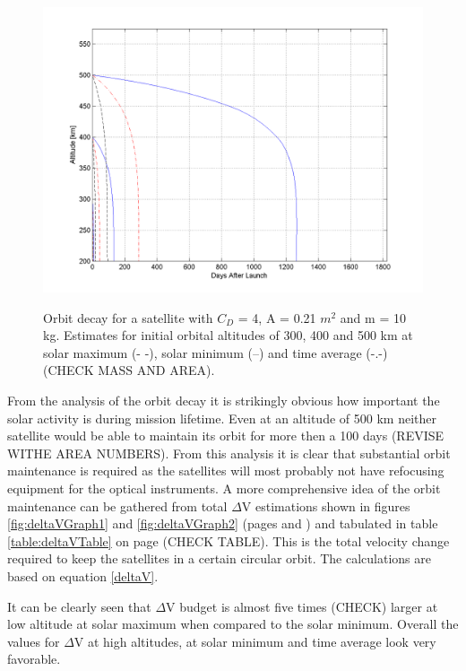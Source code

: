 \begin{figure}[h!]
\centering
\includegraphics[width=0.95\textheight, angle=90]{img/orbitDecayRecieverMin.png}
\label{fig:decayReceiver}
\caption{Orbit decay for a satellite with $C_D$ = 4, A = 0.21 $m^2$ and m = 10 kg. Estimates for initial orbital altitudes of 300, 400 and 500 km at solar maximum (- -), solar minimum (--) and time average (-.-) (CHECK MASS AND AREA).}
\end{figure}

From the analysis of the orbit decay it is strikingly obvious how important the solar activity is during mission lifetime. Even at an altitude of 500 km neither satellite would be able to maintain its orbit for more then a 100 days (REVISE WITHE AREA NUMBERS). From this analysis it is clear that substantial orbit maintenance is required as the satellites will most probably not have refocusing equipment for the optical instruments. A more comprehensive idea of the orbit maintenance can be gathered from total $\Delta$V estimations shown in figures \ref{fig:deltaVGraph1} and \ref{fig:deltaVGraph2} (pages \pageref{fig:deltaVGraph1} and \pageref{fig:deltaVGraph2}) and tabulated in table \ref{table:deltaVTable} on page \pageref{table:deltaVTable}(CHECK TABLE). This is the total velocity change required to keep the satellites in a certain circular orbit. The calculations are based on equation \ref{deltaV}.



It can be clearly seen that $\Delta$V budget is almost five times (CHECK) larger at low altitude at solar maximum when compared to the solar minimum. Overall the values for $\Delta$V at high altitudes, at solar minimum and time average look very favorable. 

